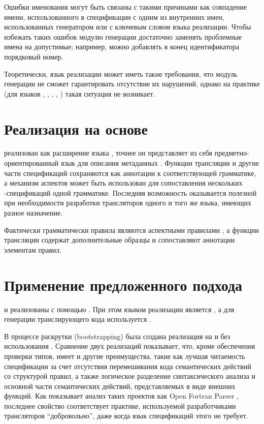 Ошибки именования могут быть связаны с такими причинами как совпадение имени, использованного в спецификации с одним из внутренних имен, использованных генератором или с ключевым словом языка реализации. Чтобы избежать таких ошибок модулю генерации достаточно заменять проблемные имена на допустимые; например, можно добавлять в конец идентификатора порядковый номер.

Теоретически, язык реализации может иметь такие требования, что модуль генерации не сможет гарантировать отсутствие их нарушений, однако на практике (для языков , , , , ) такая ситуация не возникает.

\chapter{Реализация на основе \GRM{}}

\ATF{} реализован как расширение языка \GRM{}, точнее он представляет из себя предметно-ориентированный язык для описания метаданных \GRM{}. Функции трансляции и другие части спецификаций \ATF{} сохраняются как аннотации к соответствующей грамматике, а механизм аспектов может быть использован для сопоставления нескольких \ATF{}-спецификаций одной грамматике. Последняя возможность оказывается полезной при необходимости разработки трансляторов одного и того же языка, имеющих разное назначение.

Фактически грамматически правила \ATF{} являются аспектными правилами \GRM{}, а функции трансляции содержат дополнительные образцы и сопоставляют аннотации элементам правил.

\chapter{Применение предложенного подхода}

\GRM{} и \ATF{} реализованы с помощью \ATF{}. При этом языком реализации является , а для генерации транслирующего кода используется . 

В процессе раскрутки (bootstrapping) была создана реализация на  и  без использования \ATF{}. Сравнение двух реализаций показывает, что, кроме обеспечения проверки типов, \ATF{} имеет и другие преимущества, такие как лучшая читаемость спецификации за счет отсутствия перемешивания кода семантических действий со структурой правил, а также логическое разделение синтаксического анализа и основной части семантических действий, представляемых в виде внешних функций. Как показывает анализ таких проектов как Open Fortran Parser \cite{???}, последнее свойство соответствует практике, используемой разработчиками трансляторов ``добровольно'', даже когда язык спецификаций этого не требует.

